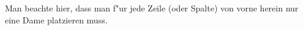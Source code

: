 \begin{enumerate}[1.]
Man beachte hier, dass man f"ur jede Zeile (oder Spalte) von vorne
herein nur eine Dame platzieren muss.









\end{enumerate}
